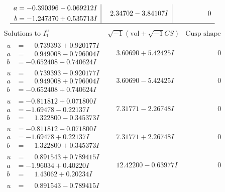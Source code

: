 \documentclass[1p]{elsarticle_modified}
\theoremstyle{definition}
\newcommand{\I}{\sqrt{-1}}
\begin{document}
$$\begin{array}{c|c|c}
\begin{aligned}
a &= -0.390396 - 0.069212 I \\
b &= -1.247370 + 0.535713 I\end{aligned}
 & \phantom{-}2.34702 - 3.84107 I & \phantom{-0.000000 } 0\\
 \hline 
 \end{array}$$\newpage$$\begin{array}{c|c|c}  
\text{Solutions to }I^u_{1}& \I (\text{vol} + \sqrt{-1}CS) & \text{Cusp shape}\\
 \hline 
\begin{aligned}
u &= \phantom{-}0.739393 + 0.920177 I \\
a &= \phantom{-}0.949008 - 0.796004 I \\
b &= -0.652408 - 0.740624 I\end{aligned}
 & \phantom{-}3.60690 + 5.42425 I & \phantom{-0.000000 } 0 \\ \hline\begin{aligned}
u &= \phantom{-}0.739393 - 0.920177 I \\
a &= \phantom{-}0.949008 + 0.796004 I \\
b &= -0.652408 + 0.740624 I\end{aligned}
 & \phantom{-}3.60690 - 5.42425 I & \phantom{-0.000000 } 0 \\ \hline\begin{aligned}
u &= -0.811812 + 0.071800 I \\
a &= -1.69478 - 0.22137 I \\
b &= \phantom{-}1.322800 - 0.345373 I\end{aligned}
 & \phantom{-}7.31771 - 2.26748 I & \phantom{-0.000000 } 0 \\ \hline\begin{aligned}
u &= -0.811812 - 0.071800 I \\
a &= -1.69478 + 0.22137 I \\
b &= \phantom{-}1.322800 + 0.345373 I\end{aligned}
 & \phantom{-}7.31771 + 2.26748 I & \phantom{-0.000000 } 0 \\ \hline\begin{aligned}
u &= \phantom{-}0.891543 + 0.789415 I \\
a &= -1.96034 + 0.40220 I \\
b &= \phantom{-}1.43062 + 0.20234 I\end{aligned}
 & \phantom{-}12.42200 - 0.63977 I & \phantom{-0.000000 } 0 \\ \hline\begin{aligned}
u &= \phantom{-}0.891543 - 0.789415 I \\

\end{aligned}
\end{array}$$
\end{document}
